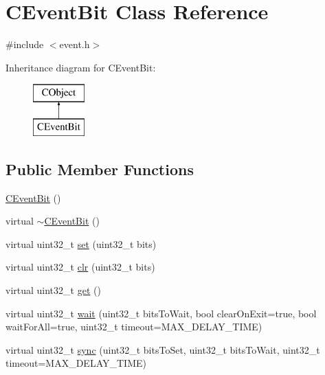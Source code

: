 \hypertarget{class_c_event_bit}{\section{C\-Event\-Bit Class Reference}
\label{class_c_event_bit}
}


{\ttfamily \#include $<$event.\-h$>$}

Inheritance diagram for C\-Event\-Bit\-:\begin{figure}[H]
\begin{center}
\leavevmode
\includegraphics[height=2.000000cm]{dd/d60/class_c_event_bit}
\end{center}
\end{figure}
\subsection*{Public Member Functions}
\begin{DoxyCompactItemize}
\item 
\hyperlink{class_c_event_bit_afaccf4ea2315ce05229a3a0ae37ba6af}{C\-Event\-Bit} ()
\item 
virtual \hyperlink{class_c_event_bit_a1e275ddfeada2601f70b1b6215cdc7cb}{$\sim$\-C\-Event\-Bit} ()
\item 
virtual uint32\-\_\-t \hyperlink{class_c_event_bit_a0b05da65aa8bb0b77dd75f0a84b8fbb0}{set} (uint32\-\_\-t bits)
\item 
virtual uint32\-\_\-t \hyperlink{class_c_event_bit_ade8e4420bd49ab351417ca955bb293e3}{clr} (uint32\-\_\-t bits)
\item 
virtual uint32\-\_\-t \hyperlink{class_c_event_bit_a52b137d375dbb670b2473222c8914081}{get} ()
\item 
virtual uint32\-\_\-t \hyperlink{class_c_event_bit_a4183fe9b9d9cc00cd0ae806c9aaba461}{wait} (uint32\-\_\-t bits\-To\-Wait, bool clear\-On\-Exit=true, bool wait\-For\-All=true, uint32\-\_\-t timeout=M\-A\-X\-\_\-\-D\-E\-L\-A\-Y\-\_\-\-T\-I\-M\-E)
\item 
virtual uint32\-\_\-t \hyperlink{class_c_event_bit_a4a50fd1376946d508762fa00d01034ce}{sync} (uint32\-\_\-t bits\-To\-Set, uint32\-\_\-t bits\-To\-Wait, uint32\-\_\-t timeout=M\-A\-X\-\_\-\-D\-E\-L\-A\-Y\-\_\-\-T\-I\-M\-E)
\end{DoxyCompactItemize}
